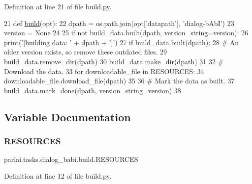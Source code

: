 Definition at line 21 of file build.\+py.


\begin{DoxyCode}
21 \textcolor{keyword}{def }\hyperlink{namespacedialog__babi__feedback_1_1build_a7a9d289f7493a5ded13c4b7f071b6184}{build}(opt):
22     dpath = os.path.join(opt[\textcolor{stringliteral}{'datapath'}], \textcolor{stringliteral}{'dialog-bAbI'})
23     version = \textcolor{keywordtype}{None}
24 
25     \textcolor{keywordflow}{if} \textcolor{keywordflow}{not} build\_data.built(dpath, version\_string=version):
26         print(\textcolor{stringliteral}{'[building data: '} + dpath + \textcolor{stringliteral}{']'})
27         \textcolor{keywordflow}{if} build\_data.built(dpath):
28             \textcolor{comment}{# An older version exists, so remove these outdated files.}
29             build\_data.remove\_dir(dpath)
30         build\_data.make\_dir(dpath)
31 
32         \textcolor{comment}{# Download the data.}
33         \textcolor{keywordflow}{for} downloadable\_file \textcolor{keywordflow}{in} RESOURCES:
34             downloadable\_file.download\_file(dpath)
35 
36         \textcolor{comment}{# Mark the data as built.}
37         build\_data.mark\_done(dpath, version\_string=version)
38 \end{DoxyCode}


\subsection{Variable Documentation}
\mbox{\label{namespaceparlai_1_1tasks_1_1dialog__babi_1_1build_a7fee8f082ba55d5b306e8e367ee211ac}} 
\subsubsection{\texorpdfstring{R\+E\+S\+O\+U\+R\+C\+ES}{RESOURCES}}
{\footnotesize\ttfamily parlai.\+tasks.\+dialog\+\_\+babi.\+build.\+R\+E\+S\+O\+U\+R\+C\+ES}



Definition at line 12 of file build.\+py.

